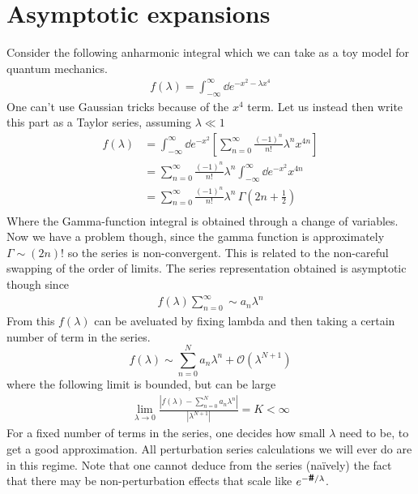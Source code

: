 \documentclass[a4paper,12pt]{article}
\begin{document}
\section{Asymptotic expansions}
Consider the following anharmonic integral which we can take as a toy model for quantum mechanics. 
\begin{equation}
	\begin{aligned}
		f(\lambda)=\int_{-\infty}^{\infty}\dd e^{-x^2-\lambda x^4}
	\end{aligned}
\end{equation}
One can't use Gaussian tricks because of the $x^4$ term. Let us instead then write this part as a Taylor series, assuming $\lambda \ll 1$
\begin{equation}
	\begin{aligned}
		f(\lambda)&=\int_{-\infty}^{\infty}\dd e^{-x^2}\left[\sum_{n=0}^{\infty}\frac{(-1)^n}{n!}\lambda^n x^{4n}\right]\\
		&=\sum_{n=0}^{\infty}\frac{(-1)^n}{n!}\lambda^n\int_{-\infty}^{\infty}\dd e^{-x^2} x^{4n}\\
		&=\sum_{n=0}^{\infty}\frac{(-1)^n}{n!}\lambda^n\,\Gamma(2n+\frac{1}{2})\\
	\end{aligned}
\end{equation}
Where the Gamma-function integral is obtained through a change of variables. Now we have a problem though, since the gamma function is approximately $\Gamma\sim (2n)!$ so the series is non-convergent. This is related to the non-careful swapping of the order of limits. The series representation obtained is asymptotic though since 
\begin{equation}
	\begin{aligned}
		f(\lambda)\sum_{n=0}^{\infty}\sim a_n\lambda^n
	\end{aligned}
\end{equation}
From this $f(\lambda)$ can be aveluated by fixing lambda and then taking a certain number of term in the series.
\begin{equation}
	f(\lambda)\sim \sum_{n=0}^{N} a_n\lambda^n+\mathcal{O} (\lambda^{N+1})
\end{equation}
where the following limit is bounded, but can be large
\begin{equation}
	\begin{aligned}
		\lim_{\lambda\to 0}\frac{|f(\lambda)-\sum_{n=0}^{N} a_n\lambda^n|}{|\lambda^{N+1}|}=K<\infty
	\end{aligned}
\end{equation}
For a fixed number of terms in the series, one decides how small $\lambda$ need to be, to get a good approximation. All perturbation series calculations we will ever do are in this regime. Note that one cannot deduce from the series (naïvely) the fact that there may be non-perturbation effects that scale like $e^{-\verb|#|/\lambda}$.
\end{document}
